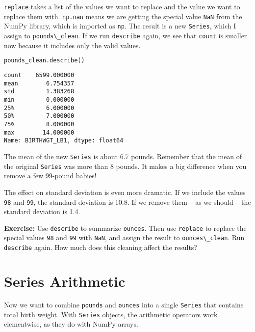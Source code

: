 \passthrough{\lstinline!replace!} takes a list of the values we want to
replace and the value we want to replace them with.
\passthrough{\lstinline!np.nan!} means we are getting the special value
\passthrough{\lstinline!NaN!} from the NumPy library, which is imported
as \passthrough{\lstinline!np!}. The result is a new
\passthrough{\lstinline!Series!}, which I assign to
\passthrough{\lstinline!pounds\_clean!}. If we run
\passthrough{\lstinline!describe!} again, we see that
\passthrough{\lstinline!count!} is smaller now because it includes only
the valid values.


\begin{lstlisting}[language=Python,style=source]
pounds_clean.describe()
\end{lstlisting}

\begin{lstlisting}[style=output]
count    6599.000000
mean        6.754357
std         1.383268
min         0.000000
25%         6.000000
50%         7.000000
75%         8.000000
max        14.000000
Name: BIRTHWGT_LB1, dtype: float64
\end{lstlisting}

The mean of the new \passthrough{\lstinline!Series!} is about 6.7
pounds. Remember that the mean of the original
\passthrough{\lstinline!Series!} was more than 8 pounds. It makes a big
difference when you remove a few 99-pound babies!

The effect on standard deviation is even more dramatic. If we include
the values \passthrough{\lstinline!98!} and
\passthrough{\lstinline!99!}, the standard deviation is 10.8. If we
remove them -- as we should -- the standard deviation is 1.4.

\textbf{Exercise:} Use \passthrough{\lstinline!describe!} to summarize
\passthrough{\lstinline!ounces!}. Then use
\passthrough{\lstinline!replace!} to replace the special values
\passthrough{\lstinline!98!} and \passthrough{\lstinline!99!} with
\passthrough{\lstinline!NaN!}, and assign the result to
\passthrough{\lstinline!ounces\_clean!}. Run
\passthrough{\lstinline!describe!} again. How much does this cleaning
affect the results?

\section{Series Arithmetic}\label{series-arithmetic}

Now we want to combine \passthrough{\lstinline!pounds!} and
\passthrough{\lstinline!ounces!} into a single
\passthrough{\lstinline!Series!} that contains total birth weight. With
\passthrough{\lstinline!Series!} objects, the arithmetic operators work
elementwise, as they do with NumPy arrays.

